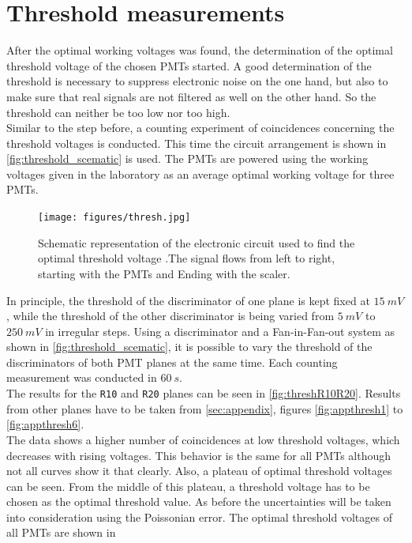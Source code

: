 \section{Threshold measurements}
After the optimal working voltages was found, the determination of the optimal threshold voltage of the chosen PMTs started.
A good determination of the threshold is necessary to suppress electronic noise on the one hand, but also to make sure that real signals are not
filtered as well on the other hand. So the threshold can neither be too low nor too high.\\
 Similar to the step before, a counting experiment of coincidences concerning the threshold voltages is conducted. This time the circuit arrangement is shown in 
 \autoref{fig:threshold_scematic} is used. The PMTs are powered using the working voltages given 
 in the laboratory as an average optimal working voltage for three PMTs. \\
\begin{figure}
   \centering
   \texttt{[image: figures/thresh.jpg]}
   \caption{Schematic representation of the electronic circuit used to find the optimal threshold voltage
   .The signal flows from left to right, starting with the PMTs and Ending with the scaler.}
   \label{fig:threshold_scematic}
\end{figure}
In principle, the threshold of the discriminator of one plane is kept fixed at $\SI{15}{mV}$, while 
the threshold of the other discriminator is being varied from $\SI{5}{mV}$ to $\SI{250}{mV}$ in irregular steps. 
Using a discriminator and a Fan-in-Fan-out system as shown in \autoref{fig:threshold_scematic}, it is possible to vary the threshold of the discriminators of both PMT planes at the same time. Each counting measurement was conducted in $\SI{60}{s}$.\\ 
The results for the \texttt{R10} and \texttt{R20} planes can be seen in \autoref{fig:threshR10R20}.
Results from other planes have to be taken from \autoref{sec:appendix}, figures \autoref{fig:appthresh1} to \autoref{fig:appthresh6}.\\

The data shows a higher number of coincidences at low threshold voltages, which decreases with rising voltages.
This behavior is the same for all PMTs although not all curves show it that clearly.  
Also, a plateau of optimal threshold voltages can be seen. From the middle of this plateau, a threshold voltage 
has to be chosen as the optimal threshold value. As before the uncertainties will be taken 
into consideration using the Poissonian error. The optimal threshold voltages of all PMTs are shown in 
